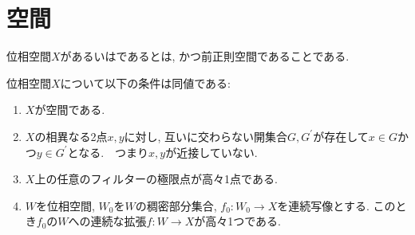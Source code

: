 \documentclass[uplatex, dvipdfmx, a4paper, 12pt, class=jsbook, crop=false]{standalone}
\begin{document}
\section{\Hausdorff 空間}
\label{sec:Hausdorff-spaces}

\begin{definition}
	位相空間$ X $があるいはであるとは, かつ前正則空間であることである.
\end{definition}

\begin{proposition}
	位相空間$ X $について以下の条件は同値である:
	\begin{enumerate}
		\item $ X $が空間である.
		\item $ X $の相異なる2点$ x, y $に対し, 互いに交わらない開集合$ G, G^\prime $が存在して$ x \in G$かつ$ y \in G^\prime $となる.　つまり$ x, y $が近接していない.
		\item $ X $上の任意のフィルターの極限点が高々1点である.
		\item $ W $を位相空間, $ W_0 $を$ W $の稠密部分集合, $ f_0 \colon W_0 \rightarrow X $を連続写像とする. このとき$ f_0 $の$ W $への連続な拡張$ f \colon W \rightarrow X$が高々1つである.
	\end{enumerate}
\end{proposition}
\end{document}

